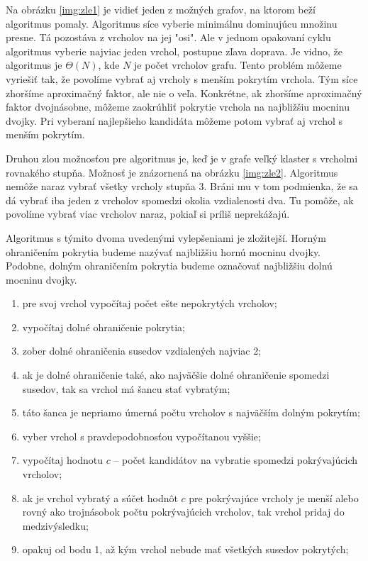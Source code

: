 Na obrázku \ref{img:zle1} je vidieť jeden z možných grafov, na ktorom beží 
algoritmus pomaly. Algoritmus síce vyberie minimálnu dominujúcu množinu presne. 
Tá pozostáva z vrcholov na jej "osi". Ale v jednom opakovaní cyklu algoritmus 
vyberie najviac jeden vrchol, postupne zľava doprava. Je vidno, že algoritmus 
je $\Theta (N)$, kde $N$ je počet vrcholov grafu. Tento problém môžeme vyriešiť 
tak, že povolíme vybrať aj vrcholy s menším pokrytím vrchola. Tým síce 
zhoršíme aproximačný faktor, ale nie o veľa. Konkrétne, ak zhoršíme aproximačný 
faktor dvojnásobne, môžeme zaokrúhliť pokrytie vrchola na najbližšiu mocninu 
dvojky. Pri vyberaní najlepšieho kandidáta môžeme potom vybrať aj vrchol s 
menším pokrytím.

Druhou zlou možnosťou pre algoritmus je, keď je v grafe veľký klaster s 
vrcholmi rovnakého stupňa. Možnosť je znázornená na obrázku \ref{img:zle2}. 
Algoritmus nemôže naraz vybrať všetky vrcholy stupňa 3. Bráni mu v tom 
podmienka, že sa dá vybrať iba jeden z vrcholov spomedzi okolia vzdialenosti 
dva. Tu pomôže, ak povolíme vybrať viac vrcholov naraz, pokiaľ si príliš 
neprekážajú.

Algoritmus s týmito dvoma uvedenými vylepšeniami je zložitejší. Horným 
ohraničením pokrytia budeme nazývať najbližšiu hornú mocninu dvojky. Podobne, 
dolným ohraničením pokrytia budeme označovať najbližšiu dolnú mocninu dvojky.


\begin{enumerate}
	\item pre svoj vrchol vypočítaj počet ešte nepokrytých vrcholov;
	\item vypočítaj dolné ohraničenie pokrytia;
	\item zober dolné ohraničenia susedov vzdialených najviac 2;
	\item ak je dolné ohraničenie také, ako najväčšie dolné ohraničenie 
		spomedzi susedov, tak sa vrchol má šancu stať vybratým;
	\item táto šanca je nepriamo úmerná počtu vrcholov s najväčším dolným 
		pokrytím;
	\item vyber vrchol s pravdepodobnosťou vypočítanou vyššie;
	\item vypočítaj hodnotu $c$ -- počet kandidátov na vybratie spomedzi 
		pokrývajúcich vrcholov;
	\item ak je vrchol vybratý a súčet hodnôt $c$ pre pokrývajúce vrcholy 
		je menší alebo rovný ako trojnásobok počtu pokrývajúcich vrcholov, 
		tak vrchol pridaj do medzivýsledku;
	\item opakuj od bodu 1, až kým vrchol nebude mať všetkých susedov 
	pokrytých;
\end{enumerate}

